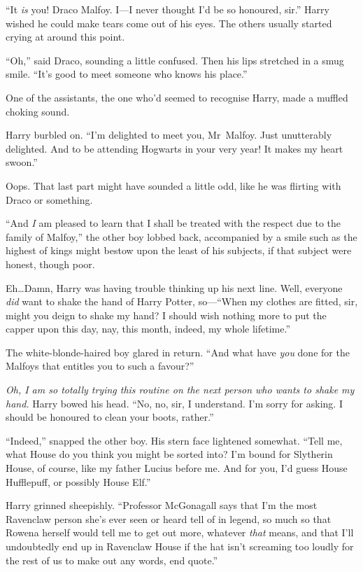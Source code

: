 “It \emph{is} you! Draco Malfoy. I—I never thought I’d be so honoured, sir.” Harry wished he could make tears come out of his eyes. The others usually started crying at around this point.

“Oh,” said Draco, sounding a little confused. Then his lips stretched in a smug smile. “It’s good to meet someone who knows his place.”

One of the assistants, the one who’d seemed to recognise Harry, made a muffled choking sound.

Harry burbled on. “I’m delighted to meet you, Mr~Malfoy. Just unutterably delighted. And to be attending Hogwarts in your very year! It makes my heart swoon.”

Oops. That last part might have sounded a little odd, like he was flirting with Draco or something.

“And \emph{I} am pleased to learn that I shall be treated with the respect due to the family of Malfoy,” the other boy lobbed back, accompanied by a smile such as the highest of kings might bestow upon the least of his subjects, if that subject were honest, though poor.

Eh…Damn, Harry was having trouble thinking up his next line. Well, everyone \emph{did} want to shake the hand of Harry Potter, so—“When my clothes are fitted, sir, might you deign to shake my hand? I should wish nothing more to put the capper upon this day, nay, this month, indeed, my whole lifetime.”

The white-blonde-haired boy glared in return. “And what have \emph{you} done for the Malfoys that entitles you to such a favour?”

\emph{Oh, I am so totally trying this routine on the next person who wants to shake my hand.} Harry bowed his head. “No, no, sir, I understand. I’m sorry for asking. I should be honoured to clean your boots, rather.”

“Indeed,” snapped the other boy. His stern face lightened somewhat. “Tell me, what House do you think you might be sorted into? I’m bound for Slytherin House, of course, like my father Lucius before me. And for you, I’d guess House Hufflepuff, or possibly House Elf.”

Harry grinned sheepishly. “Professor McGonagall says that I’m the most Ravenclaw person she’s ever seen or heard tell of in legend, so much so that Rowena herself would tell me to get out more, whatever \emph{that} means, and that I’ll undoubtedly end up in Ravenclaw House if the hat isn’t screaming too loudly for the rest of us to make out any words, end quote.”

